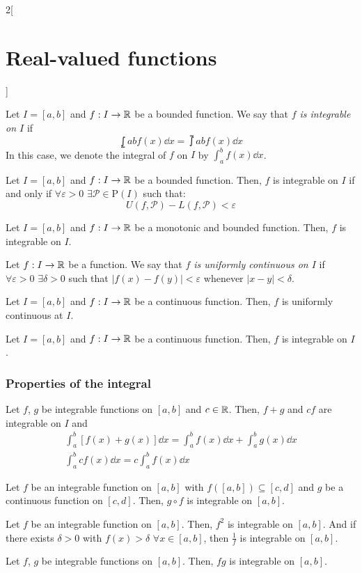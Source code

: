 \documentclass[../../../main.tex]{subfiles}
\begin{document}
\begin{multicols}{2}[\section{Real-valued functions}]
\begin{definition}
  \end{definition}
  \begin{definition}\label{RVF_integrable}
    Let $I=[a,b]$ and $f:I\rightarrow\mathbb{R}$ be a bounded function. We say that \textit{$f$ is integrable on $I$} if $$\lowint{a}{b}f(x)\dd x=\upint{a}{b}f(x)\dd x$$ In this case, we denote the integral of $f$ on $I$ by $\displaystyle\int_a^b f(x)\dd x$.
  \end{definition}
  \begin{lemma}
    Let $I=[a,b]$ and $f:I\rightarrow\mathbb{R}$ be a bounded function. Then, $f$ is integrable on $I$ if and only if $\forall\varepsilon>0$ $\exists\mathcal{P}\in\mathrm{P}(I)$ such that: $$U(f,\mathcal{P})-L(f,\mathcal{P})<\varepsilon$$
  \end{lemma}
  \begin{theorem}
    Let $I=[a,b]$ and $f:I\rightarrow\mathbb{R}$ be a monotonic and bounded function. Then, $f$ is integrable on $I$.
  \end{theorem}
  \begin{definition}
    Let $f:I\rightarrow\mathbb{R}$ be a function. We say that \textit{$f$ is uniformly continuous on $I$} if $\forall\varepsilon>0$ $\exists\delta>0$ such that $|f(x)-f(y)|<\varepsilon$ whenever $|x-y|<\delta$.
  \end{definition}
  \begin{theorem}
    Let $I=[a,b]$ and $f:I\rightarrow\mathbb{R}$ be a continuous function. Then, $f$ is uniformly continuous at $I$.
  \end{theorem}
  \begin{theorem}
    Let $I=[a,b]$ and $f:I\rightarrow\mathbb{R}$ be a continuous function. Then, $f$ is integrable on $I$.
  \end{theorem}
  \subsubsection{Properties of the integral}
  \begin{prop}
    Let $f$, $g$ be integrable functions on $[a,b]$ and $c\in\mathbb{R}$. Then, $f+g$ and $cf$ are integrable on $I$ and
    \begin{gather*}
      \int_a^b[f(x)+g(x)]\dd x=\int_a^bf(x)\dd x+\int_a^bg(x)\dd x\\ \int_a^bcf(x)\dd x=c\int_a^bf(x)\dd x
    \end{gather*}
  \end{prop}
  \begin{theorem}
    Let $f$ be an integrable function on $[a,b]$ with $f([a,b])\subseteq[c,d]$ and $g$ be a continuous function on $[c,d]$. Then, $g\circ f$ is integrable on $[a,b]$.
  \end{theorem}
  \begin{corollary}
    Let $f$ be an integrable function on $[a,b]$. Then, $f^2$ is integrable on $[a,b]$. And if there exists $\delta>0$ with $f(x)>\delta$ $\forall x\in [a,b]$, then $\frac{1}{f}$ is integrable on $[a,b]$.
  \end{corollary}
  \begin{corollary}
    Let $f$, $g$ be integrable functions on $[a,b]$. Then, $fg$ is integrable on $[a,b]$.
  \end{corollary}

\end{multicols}
\end{document}
